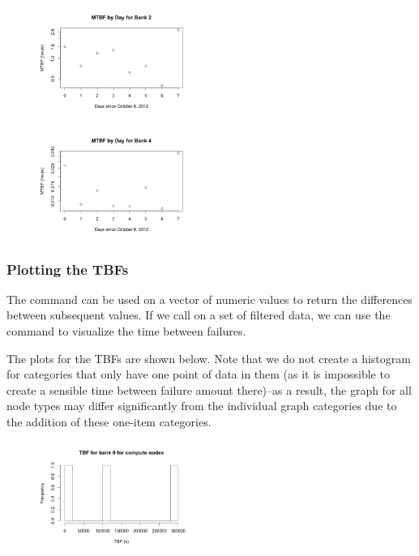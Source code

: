 \begin{t able}[t]
\begin{figure}
\centering
\includegraphics[width=0.45\textwidth]{images/mtbf_2.png}
\end{figure}

\begin{figure}
\centering
\includegraphics[width=0.45\textwidth]{images/mtbf_4.png}
\end{figure}

\subsubsection{Plotting the TBFs}

The  command can be used on a vector of numeric values to return the differences between subsequent values.  If we call  on a set of filtered data, we can use the  command to visualize the time between failures.

The plots for the TBFs are shown below.  Note that we do not create a histogram for categories that only have one point of data in them (as it is impossible to create a sensible time between failure amount there)--as a result, the graph for all node types may differ significantly from the individual graph categories due to the addition of these one-item categories.


\begin{figure}
\centering
\includegraphics[width=0.45\textwidth]{images/tbf_0_c.png}
\end{figure}


\end{t able}
